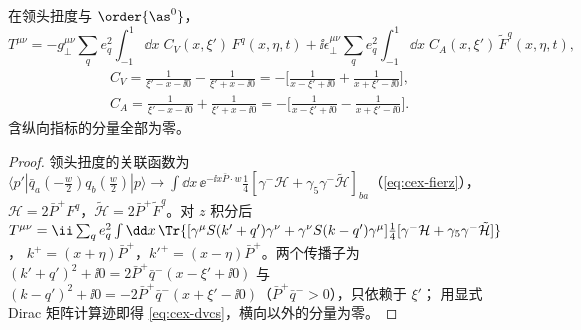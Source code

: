 \begin{proposition}\tagR\label{prop:cex-dvcs}
在领头扭度与 $\order{\as^0}$，
\begin{equation}\label{eq:cex-dvcs}
T^{\mu\nu}=-g_\perp^{\mu\nu}\sum_qe_q^2\int_{-1}^1\!\dd x\;C_V(x,\xi')\,F^q(x,\eta,t)+\ii\epsilon_\perp^{\mu\nu}\sum_qe_q^2\int_{-1}^1\!\dd x\;C_A(x,\xi')\,\tilde F^q(x,\eta,t),
\end{equation}
\begin{equation}\label{eq:cex-CVCA}
\begin{gathered}
C_V=\frac{1}{\xi'-x-\ii0}-\frac{1}{\xi'+x-\ii0}=-\Big[\frac{1}{x-\xi'+\ii0}+\frac{1}{x+\xi'-\ii0}\Big],\\
C_A=\frac{1}{\xi'-x-\ii0}+\frac{1}{\xi'+x-\ii0}=-\Big[\frac{1}{x-\xi'+\ii0}-\frac{1}{x+\xi'-\ii0}\Big].
\end{gathered}
\end{equation}
含纵向指标的分量全部为零。
\end{proposition}

\begin{proof}
领头扭度的关联函数为 $\langle p'|\bar q_a(-\frac w2)q_b(\frac w2)|p\rangle\to\int\dd x\,\ee^{-\ii x\bar P\cdot w}\frac14[\gamma^-\mathcal H+\gamma_5\gamma^-\tilde{\mathcal H}]_{ba}$（\cref{eq:cex-fierz}），
$\mathcal H=2\bar P^+F^q$，$\tilde{\mathcal H}=2\bar P^+\tilde F^q$。对 $z$ 积分后
$T^{\mu\nu}=\ii\sum_qe_q^2\int\dd x\,\Tr\{[\gamma^\mu S(k'+q')\gamma^\nu+\gamma^\nu S(k-q')\gamma^\mu]\frac14[\gamma^-\mathcal H+\gamma_5\gamma^-\tilde{\mathcal H}]\}$，
$k^+=(x+\eta)\bar P^+$，$k'^+=(x-\eta)\bar P^+$。两个传播子为
$(k'+q')^2+\ii0=2\bar P^+\bar q^-(x-\xi'+\ii0)$ 与 $(k-q')^2+\ii0=-2\bar P^+\bar q^-(x+\xi'-\ii0)$（$\bar P^+\bar q^->0$），只依赖于 $\xi'$；
用显式 Dirac 矩阵计算迹即得 \cref{eq:cex-dvcs}，横向以外的分量为零。
\end{proof}

